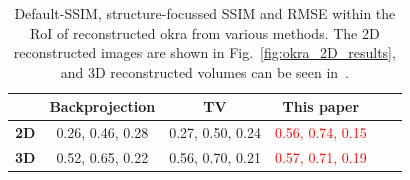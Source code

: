 \documentclass[journal]{IEEEtran}
\begin{document}

\begin{table}[!h]
  \centering
  \caption{Default-SSIM, structure-focussed SSIM and RMSE within the RoI of reconstructed okra from various
    methods. 
The 2D reconstructed images are shown in Fig.~\ref{fig:okra_2D_results}, and 3D reconstructed volumes can be seen in~\cite{supp_paper}.}
\begin{tabular}{|l|c|c|c|c|c|}
\hline &
\textbf{Backprojection} & \textbf{TV} &
\textbf{This paper} \\ \hline \textbf{2D} & 0.26, 0.46, 0.28
& 0.27, 0.50, 0.24 & \textcolor{red}{0.56, 0.74, 0.15} \\ 
\hline \textbf{3D} & 0.52, 0.65, 0.22 & 0.56, 0.70, 0.21 & \textcolor{red}{0.57, 0.71, 0.19}
\\ \hline
\end{tabular}
\label{table:okra_ssim}
\end{table}
\end{document}
